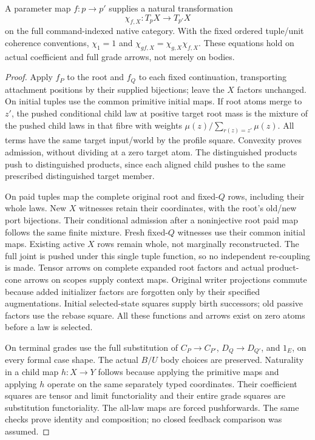 \documentclass[11pt]{article}
\begin{document}
\begin{lemma}
A parameter map $f:p\to p'$ supplies a natural transformation
\[
 \chi_{f,X}:T_pX\longrightarrow T_{p'}X
\]
on the full command-indexed native category. With the fixed ordered tuple/unit coherence conventions, $\chi_{1}=1$ and
$\chi_{gf,X}=\chi_{g,X}\chi_{f,X}$. These equations hold on actual coefficient and full grade arrows, not merely on bodies.
\end{lemma}
\begin{proof}
Apply $f_P$ to the root and $f_Q$ to each fixed continuation, transporting attachment positions by their supplied bijections; leave the $X$ factors unchanged. On initial tuples use the common primitive initial maps. If root atoms merge to $z'$, the pushed conditional child law at positive target root mass is the mixture of the pushed child laws in that fibre with weights $\mu(z)/\sum_{r(z)=z'}\mu(z)$. All terms have the same target input/world by the profile square. Convexity proves admission, without dividing at a zero target atom. The distinguished products push to distinguished products, since each aligned child pushes to the same prescribed distinguished target member.

On paid tuples map the complete original root and fixed-$Q$ rows, including their whole laws. New $X$ witnesses retain their coordinates, with the root's old/new port bijections. Their conditional admission after a noninjective root paid map follows the same finite mixture. Fresh fixed-$Q$ witnesses use their common initial maps. Existing active $X$ rows remain whole, not marginally reconstructed. The full joint is pushed under this single tuple function, so no independent re-coupling is made. Tensor arrows on complete expanded root factors and actual product-cone arrows on scopes supply context maps. Original writer projections commute because added initializer factors are forgotten only by their specified augmentations. Initial selected-state squares supply birth successors; old passive factors use the rebase square. All these functions and arrows exist on zero atoms before a law is selected.

On terminal grades use the full substitution of $C_P\to C_{P'}$, $D_Q\to D_{Q'}$, and $1_E$, on every formal case shape. The actual $B/U$ body choices are preserved. Naturality in a child map $h:X\to Y$ follows because applying the primitive maps and applying $h$ operate on the same separately typed coordinates. Their coefficient squares are tensor and limit functoriality and their entire grade squares are substitution functoriality. The all-law maps are forced pushforwards. The same checks prove identity and composition; no closed feedback comparison was assumed.
\end{proof}
\end{document}

